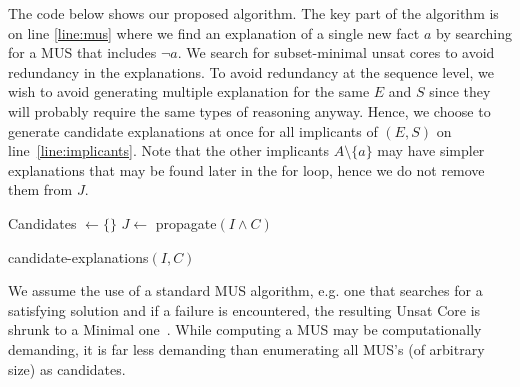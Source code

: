 The code below shows our proposed algorithm. The key part of the algorithm is on line \ref{line:mus} where we find an explanation of a single new fact $a$ by searching for a MUS that includes $\neg a$.
We search for subset-minimal unsat cores to avoid redundancy in the explanations. To avoid redundancy at the sequence level, we wish to avoid generating multiple explanation for the same $E$ and $S$ since they will probably require the same types of reasoning anyway. Hence, we choose to generate candidate explanations at once for all implicants of $(E, S)$ on line~\ref{line:implicants}. Note that the other implicants $A \setminus \{a\}$ may have simpler explanations that may be found later in the for loop, hence we do not remove them from $J$.

\begin{algorithm}
% 

% 

  Candidates $\gets \{\}$\;
  $J \gets$ propagate$(I \wedge C)$\;
\caption{candidate-explanations$(I,C)$}

\label{alg:cand}
\end{algorithm}


We assume the use of a standard MUS algorithm, e.g. one that searches for a satisfying solution and if a failure is encountered, the resulting Unsat Core is shrunk to a Minimal one~\cite{marques2010minimal}. While computing a MUS may be computationally demanding, it is far less demanding than enumerating all MUS's (of arbitrary size) as candidates. 


